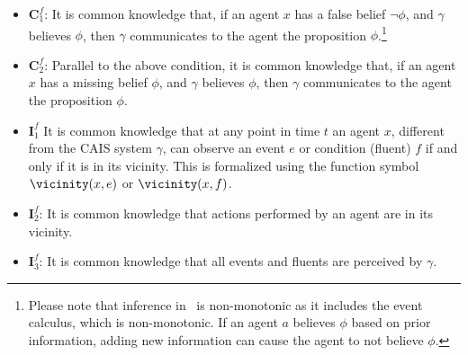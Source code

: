     \begin{itemize}
    \item $\mathbf{C}^f_1$: It is common knowledge that, if an agent
      $x$ has a false belief $\lnot \phi$, and $\gamma$
      believes $\phi$, then $\gamma$ communicates to the agent the
      proposition $\phi$.\footnote{Please note that inference in
        \DCEC\ is non-monotonic as it includes the event calculus,
        which is non-monotonic.  If an agent $a$ believes $\phi$ based
        on prior information, adding new information can cause the
        agent to not believe $\phi$.}

    \item $\mathbf{C}^f_2$: Parallel to the above condition, it is
      common knowledge that, if an agent $x$ has a missing belief
      $\phi$, and $\gamma$ believes $\phi$, then $\gamma$ communicates to
      the agent the proposition $\phi$.

    \item$\mathbf{I}^f_1$ It is common knowledge that at any point in
      time $t$ an agent $x$, different from the CAIS system $\gamma$,
      can observe an event $e$ or condition (fluent) $f$ if and only if
      it is in its vicinity. This is formalized using the function symbol
      $\vicinity(x, e)$ or $\vicinity(x, f)$.

      \item $\mathbf{I}^f_2$: It is common knowledge that actions
        performed by an agent are in its vicinity.

      \item $\mathbf{I}^f_3$: It is common knowledge that all events
        and fluents are perceived by $\gamma$.
     \end{itemize}



